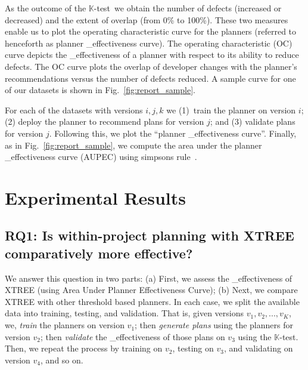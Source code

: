 \documentclass[10pt, journal, compsoc]{IEEEtran}
\newcommand{\ktest}{$\mathbb{K}$-test}
\newcommand{\fig}[1]{Fig.~\ref{fig:#1}}
\begin{document}
As the outcome of the {\ktest}~we obtain the number of defects (increased or decreased) and the extent of overlap (from 0\% to 100\%). These two measures enable us to plot the operating characteristic curve for the planners (referred to henceforth as planner _effectiveness curve). The operating characteristic (OC) curve depicts the _effectiveness of a planner with respect to its ability to reduce defects. The OC curve plots the overlap of developer changes with the planner's recommendations versus the number of defects reduced. A sample curve for one of our datasets is shown in \fig{report_sample}.

For each of the datasets with versions $i, j, k$ we (1)~train the planner on version $i$; (2) deploy the planner to recommend plans for version $j$; and (3) validate plans for version $j$. Following this, we plot the ``planner _effectiveness curve''. Finally, as in \fig{report_sample}, we compute the area under the planner _effectiveness curve (AUPEC) using simpsons rule~\cite{Burden:1988}.




 




\section{Experimental Results}
\label{sect:results}
\subsection*{{\bf RQ1: Is within-project planning with XTREE comparatively
more effective?}}

We answer this question in two parts: (a) First, we assess the _effectiveness of XTREE (using Area Under Planner Effectiveness Curve); (b) Next, we compare XTREE with other threshold based planners. In each case, we split the available data into training, testing, and validation. That is, given versions $v_1, v_2, ..., v_K$, we,
{\em train} the planners on version $v_1$; then 
{\em generate plans} using the planners for version $v_2$;
then {\em validate} the _effectiveness of those plans on $v_3$ using the \ktest.
Then,  we repeat the process by training on $v_2$, testing on $v_3$, and validating on version $v_4$, and so on.
\end{document}
